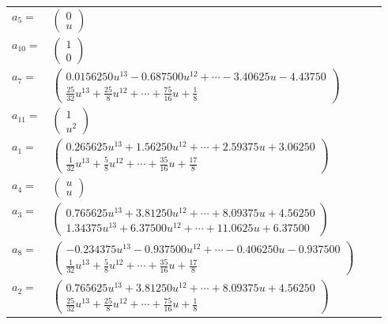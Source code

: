 \documentclass[1p]{elsarticle_modified}
\theoremstyle{definition}
\begin{document}
\begin{tabular}{m{7pt} m{180pt} m{7pt} m{180pt} }
\flushright $a_{5}=$&$\begin{pmatrix}0\\u\end{pmatrix}$ \\
\flushright $a_{10}=$&$\begin{pmatrix}1\\0\end{pmatrix}$ \\
\flushright $a_{7}=$&$\begin{pmatrix}0.0156250 u^{13}-0.687500 u^{12}+\cdots-3.40625 u-4.43750\\\frac{25}{32} u^{13}+\frac{25}{8} u^{12}+\cdots+\frac{75}{16} u+\frac{1}{8}\end{pmatrix}$ \\
\flushright $a_{11}=$&$\begin{pmatrix}1\\u^2\end{pmatrix}$ \\
\flushright $a_{1}=$&$\begin{pmatrix}0.265625 u^{13}+1.56250 u^{12}+\cdots+2.59375 u+3.06250\\\frac{1}{32} u^{13}+\frac{5}{8} u^{12}+\cdots+\frac{35}{16} u+\frac{17}{8}\end{pmatrix}$ \\
\flushright $a_{4}=$&$\begin{pmatrix}u\\u\end{pmatrix}$ \\
\flushright $a_{3}=$&$\begin{pmatrix}0.765625 u^{13}+3.81250 u^{12}+\cdots+8.09375 u+4.56250\\1.34375 u^{13}+6.37500 u^{12}+\cdots+11.0625 u+6.37500\end{pmatrix}$ \\
\flushright $a_{8}=$&$\begin{pmatrix}-0.234375 u^{13}-0.937500 u^{12}+\cdots-0.406250 u-0.937500\\\frac{1}{32} u^{13}+\frac{5}{8} u^{12}+\cdots+\frac{35}{16} u+\frac{17}{8}\end{pmatrix}$ \\
\flushright $a_{2}=$&$\begin{pmatrix}0.765625 u^{13}+3.81250 u^{12}+\cdots+8.09375 u+4.56250\\\frac{25}{32} u^{13}+\frac{25}{8} u^{12}+\cdots+\frac{75}{16} u+\frac{1}{8}\end{pmatrix}$ \\

\end{tabular}
\end{document}
